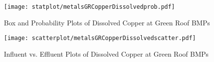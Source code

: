         \begin{figure}[hb]   %
            \centering
            \texttt{[image: statplot/metalsGRCopperDissolvedprob.pdf]}
            \caption{Box and Probability Plots of Dissolved Copper at Green Roof BMPs}
        \end{figure}         %
        
        
        \begin{figure}[hb]   %
            \centering
            \texttt{[image: scatterplot/metalsGRCopperDissolvedscatter.pdf]}
            \caption{Influent vs. Effluent Plots of Dissolved Copper at Green Roof BMPs}
        \end{figure}         %
        \clearpage
        